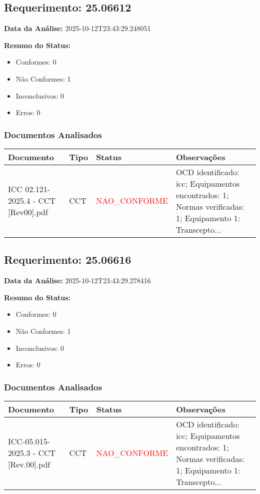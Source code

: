 \documentclass[12pt,a4paper]{article}
\begin{document}
\subsection{Requerimento: 25.06612}

\textbf{Data da Análise:} 2025-10-12T23:43:29.248051

\textbf{Resumo do Status:}
\begin{itemize}
    \item Conformes: 0
    \item Não Conformes: 1
    \item Inconclusivos: 0
    \item Erros: 0
\end{itemize}

\subsubsection{Documentos Analisados}

\begin{longtable}{|p{4cm}|p{2cm}|p{2cm}|p{6cm}|}
\hline
\textbf{Documento} & \textbf{Tipo} & \textbf{Status} & \textbf{Observações} \\
\hline
\endhead
ICC 02.121-2025.4 - CCT [Rev00].pdf & CCT & \textcolor{red}{NAO\_CONFORME} & OCD identificado: icc; Equipamentos encontrados: 1; Normas verificadas: 1; Equipamento 1: Transcepto... \\
\hline
\end{longtable}


\subsection{Requerimento: 25.06616}

\textbf{Data da Análise:} 2025-10-12T23:43:29.278416

\textbf{Resumo do Status:}
\begin{itemize}
    \item Conformes: 0
    \item Não Conformes: 1
    \item Inconclusivos: 0
    \item Erros: 0
\end{itemize}

\subsubsection{Documentos Analisados}

\begin{longtable}{|p{4cm}|p{2cm}|p{2cm}|p{6cm}|}
\hline
\textbf{Documento} & \textbf{Tipo} & \textbf{Status} & \textbf{Observações} \\
\hline
\endhead
ICC-05.015-2025.3 - CCT [Rev.00].pdf & CCT & \textcolor{red}{NAO\_CONFORME} & OCD identificado: icc; Equipamentos encontrados: 1; Normas verificadas: 1; Equipamento 1: Transcepto... \\
\hline
\end{longtable}
\end{document}
